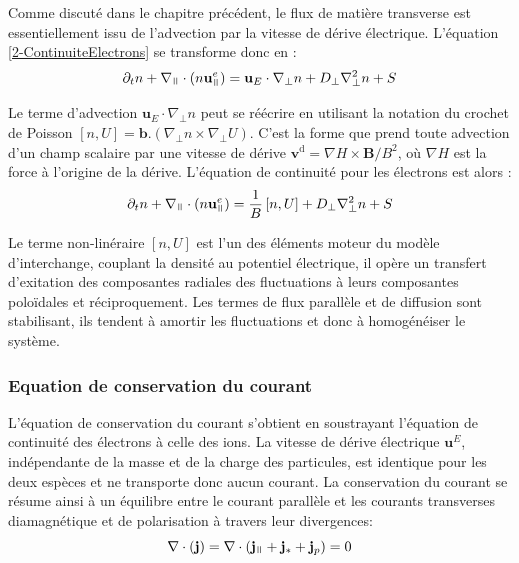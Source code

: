 Comme discuté dans le chapitre précédent, le flux de matière transverse est
essentiellement issu de l'advection par la vitesse de
dérive électrique. L'équation \ref{2-ContinuiteElectrons} se transforme donc en :
\begin{equation}
\label{2-ContinuiteElectrons2}
\partial_t n + \nabla_\para\cdot(n\mathbf{u}^e_{\para}) =
\mathbf{u}_E\cdot\nabla_\perp n + D_\perp\nabla^2_\perp n + S
\end{equation}

Le terme d'advection $\mathbf{u}_E\cdot\nabla_\perp
n$ peut se réécrire en utilisant la notation
du crochet de Poisson $[n,U]=\mathbf{b}.(\nabla_\perp n\times\nabla_\perp U)$.
C'est la forme que prend toute advection d'un champ scalaire par une vitesse de
dérive $\mathbf{v}^\text{d}=\nabla H\times\mathbf{B}/B^2$, où $\nabla H$ est la
force à l'origine de la dérive. L'équation de continuité pour les électrons est
alors :
\begin{equation}
\partial_t n + \nabla_{\para}\cdot(n\mathbf{u}^e_{\para}) =
\frac{1}{B}\left[n,U\right] + D_\perp\nabla^2_\perp n + S
\end{equation}

Le terme non-linéraire $[n,U]$ est l'un des éléments moteur du modèle
d'interchange, couplant la densité au potentiel électrique, il opère un
transfert d'exitation des composantes radiales des fluctuations à leurs
composantes poloïdales et réciproquement. Les termes de flux parallèle et de
diffusion sont stabilisant, ils tendent à
amortir les fluctuations et donc à homogénéiser le système.

\subsubsection{Equation de conservation du courant}
L'équation de conservation du courant s'obtient en soustrayant l'équation de
continuité des électrons à celle des ions. La vitesse de dérive électrique
$\mathbf{u}^E$, indépendante de la masse et de la charge des particules, est
identique pour les deux espèces et ne transporte donc aucun courant. 
La conservation du courant se résume ainsi à un équilibre entre le courant
parallèle et les courants transverses diamagnétique et de polarisation à
travers leur divergences:
\begin{equation}
\label{EqCourant1}
\nabla\cdot\left(\mathbf{j}\right) = 
\nabla\cdot\left(\mathbf{j}_\para+\mathbf{j}_*+\mathbf{j}_p\right)
= 0
\end{equation}

